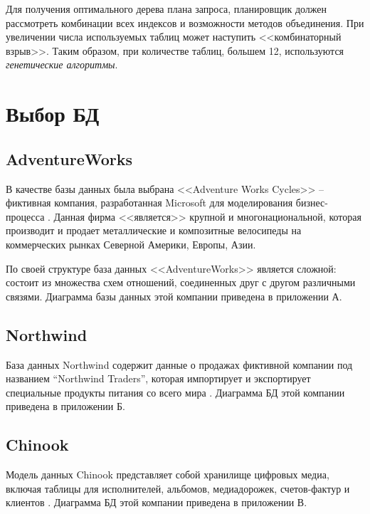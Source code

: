 Для получения оптимального дерева плана запроса, планировщик должен рассмотреть комбинации всех индексов и возможности методов объединения. При увеличении числа используемых таблиц может наступить <<комбинаторный взрыв>>. Таким образом, при количестве таблиц, большем 12, используются \textit{генетические алгоритмы}.

\section{Выбор БД}

\subsection{AdventureWorks}
В качестве базы данных была выбрана <<Adventure Works Cycles>> -- фиктивная компания, разработанная Microsoft для моделирования бизнес-процесса \cite{adventureworks}. Данная фирма <<является>> крупной и многонациональной, которая производит и продает металлические и композитные велосипеды на коммерческих рынках Северной Америки, Европы, Азии.

По своей структуре база данных <<AdventureWorks>> является сложной: состоит из множества схем отношений, соединенных друг с другом различными связями. Диаграмма базы данных этой компании приведена в приложении А.

\subsection{Northwind}
База данных Northwind содержит данные о продажах фиктивной компании под названием “Northwind Traders”, которая импортирует и экспортирует специальные продукты питания со всего мира \cite{northwind}. Диаграмма БД этой компании приведена в приложении Б.

\subsection{Chinook}
Модель данных Chinook представляет собой хранилище цифровых медиа, включая таблицы для исполнителей, альбомов, медиадорожек, счетов-фактур и клиентов \cite{chinook}. Диаграмма БД этой компании приведена в приложении В.

